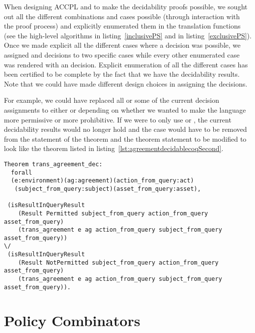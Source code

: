 When designing \ac{ACCPL} and to make the decidability proofs possible, we sought out all the different combinations and cases possible (through interaction with the proof process) and explicitly enumerated them in the translation functions (see the high-level algorithms in listing~\ref{inclusivePS} and in listing~\ref{exclusivePS}). Once we made explicit all the different cases where a decision was possible, we assigned  and  decisions to two specific cases while every other enumerated case was rendered with an  decision. Explicit enumeration of all the different cases has been certified to be complete by the fact that we have the decidability results. Note that we could have made different design choices in assigning the decisions. 

For example, we could have replaced all or some of the current  decision assignments to either  or  depending on whether we wanted to make the language more permissive or more prohibitive. If we were to only use  or , the current decidability results would no longer hold and the  case would have to be removed from the statement of the theorem and the theorem statement to be modified to look like the theorem listed in listing~\ref{lst:agreementdecidablecoqSecond}.

\begin{minipage}[c]{0.95\textwidth}
\begin{lstlisting}
Theorem trans_agreement_dec:
  forall
  (e:environment)(ag:agreement)(action_from_query:act)
   (subject_from_query:subject)(asset_from_query:asset),

 (isResultInQueryResult 
    (Result Permitted subject_from_query action_from_query asset_from_query)
    (trans_agreement e ag action_from_query subject_from_query asset_from_query)) 
\/
 (isResultInQueryResult 
    (Result NotPermitted subject_from_query action_from_query asset_from_query)
    (trans_agreement e ag action_from_query subject_from_query asset_from_query)).

\end{lstlisting}
\end{minipage}

\section{Policy Combinators}\label{sec:policycombinators}

